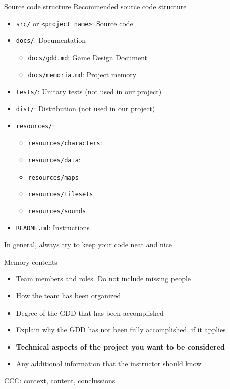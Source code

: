 \documentclass[10pt,compress]{beamer} %
\begin{document}
\begin{frame}{Source code structure}
	Recommended source code structure
	\begin{itemize}
	\item \texttt{src/} or \texttt{<project name>}: Source code
	\item \texttt{docs/}: Documentation
		\begin{itemize}
		\item \texttt{docs/gdd.md}: Game Design Document
		\item \texttt{docs/memoria.md}: Project memory
		\end{itemize}
	\item \texttt{tests/}: Unitary tests (not used in our project)
	\item \texttt{dist/}: Distribution (not used in our project)
	\item \texttt{resources/}:
		\begin{itemize}
		\item \texttt{resources/characters}:
		\item \texttt{resources/data}:
		\item \texttt{resources/maps}
		\item \texttt{resources/tilesets}
		\item \texttt{resources/sounds}
		\end{itemize}
    \item \texttt{README.md}: Instructions
	\end{itemize}
   In general, always try to keep your code neat and nice
\end{frame}

\begin{frame}{Memory contents}
	\begin{itemize}
	\item Team members and roles. Do not include missing people
	\item How the team has been organized
	\item Degree of the GDD that has been accomplished
	\item Explain why the GDD has not been fully accomplished, if it applies
    \item \textbf{Technical aspects of the project you want to be considered}
    \item Any additional information that the instructor should know
	\end{itemize}
    
    \bigskip

    CCC: context, content, conclussions
\end{frame}
\end{document}
